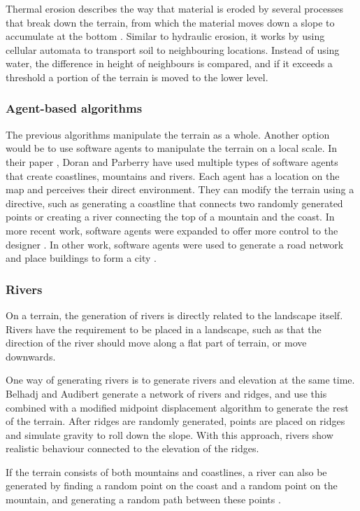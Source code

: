 \documentclass{article}
\begin{document}
Thermal erosion describes the way that material is eroded by several processes that break down the terrain, from which the material moves down a slope to accumulate at the bottom \cite{musgrave_synthesis_1989}. Similar to hydraulic erosion, it works by using cellular automata to transport soil to neighbouring locations. Instead of using water, the difference in height of neighbours is compared, and if it exceeds a threshold a portion of the terrain is moved to the lower level.

\subsubsection{Agent-based algorithms}
The previous algorithms manipulate the terrain as a whole. Another option would be to use software agents to manipulate the terrain on a local scale. In their paper \cite{doran_controlled_2010}, Doran and Parberry have used multiple types of software agents that create coastlines, mountains and rivers. Each agent has a location on the map and perceives their direct environment. They can modify the terrain using a directive, such as generating a coastline that connects two randomly generated points or creating a river connecting the top of a mountain and the coast. In more recent work, software agents were expanded to offer more control to the designer \cite{skold_generating_2023}. In other work, software agents were used to generate a road network and place buildings to form a city \cite{lechner_procedural_2003}.

\subsubsection{Rivers}
On a terrain, the generation of rivers is directly related to the landscape itself. Rivers have the requirement to be placed in a landscape, such as that the direction of the river should move along a flat part of terrain, or move downwards.

One way of generating rivers is to generate rivers and elevation at the same time. Belhadj and Audibert \cite{belhadj_modeling_2005} generate a network of rivers and ridges, and use this combined with a modified midpoint displacement algorithm to generate the rest of the terrain. After ridges are randomly generated, points are placed on ridges and simulate gravity to roll down the slope. With this approach, rivers show realistic behaviour connected to the elevation of the ridges.

If the terrain consists of both mountains and coastlines, a river can also be generated by finding a random point on the coast and a random point on the mountain, and generating a random path between these points \cite{doran_controlled_2010} \cite{prusinkiewicz_fractal_1993}.
\end{document}
